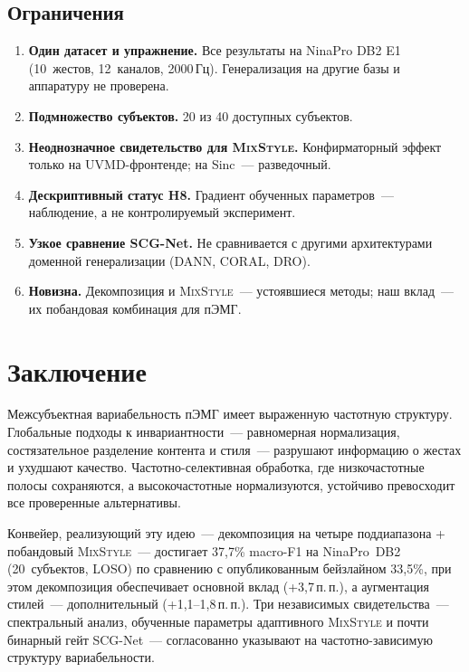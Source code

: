 \documentclass[conference]{IEEEtran}
\newcommand{\pp}{\,п.\,п.}
\newcommand{\mixstyle}{\textsc{MixStyle}}
\newcommand{\uvmd}{\textsc{UVMD}}
\begin{document}
\subsection{Ограничения}
\begin{enumerate}
    \item \textbf{Один датасет и упражнение.} Все результаты на NinaPro DB2 E1 (10~жестов, 12~каналов, 2000\,Гц). Генерализация на другие базы и аппаратуру не проверена.
    \item \textbf{Подмножество субъектов.} 20 из 40 доступных субъектов.
    \item \textbf{Неоднозначное свидетельство для \mixstyle{}.} Конфирматорный эффект только на \uvmd{}-фронтенде; на Sinc~--- разведочный.
    \item \textbf{Дескриптивный статус H8.} Градиент обученных параметров~--- наблюдение, а не контролируемый эксперимент.
    \item \textbf{Узкое сравнение SCG-Net.} Не сравнивается с другими архитектурами доменной генерализации (DANN, CORAL, DRO).
    \item \textbf{Новизна.} Декомпозиция и \mixstyle{}~--- устоявшиеся методы; наш вклад~--- их побандовая комбинация для пЭМГ.
\end{enumerate}

\section{Заключение}
\label{sec:conclusion}

Межсубъектная вариабельность пЭМГ имеет выраженную частотную структуру.
Глобальные подходы к инвариантности~--- равномерная нормализация, состязательное разделение контента и стиля~--- разрушают информацию о жестах и ухудшают качество.
Частотно-селективная обработка, где низкочастотные полосы сохраняются, а высокочастотные нормализуются, устойчиво превосходит все проверенные альтернативы.

Конвейер, реализующий эту идею~--- декомпозиция на четыре поддиапазона + побандовый \mixstyle{}~--- достигает 37,7\% macro-F1 на NinaPro~DB2 (20~субъектов, LOSO) по сравнению с опубликованным бейзлайном 33,5\%, при этом декомпозиция обеспечивает основной вклад (+3,7\pp{}), а аугментация стилей~--- дополнительный (+1,1--1,8\pp{}).
Три независимых свидетельства~--- спектральный анализ, обученные параметры адаптивного \mixstyle{} и почти бинарный гейт SCG-Net~--- согласованно указывают на частотно-зависимую структуру вариабельности.
\end{document}

